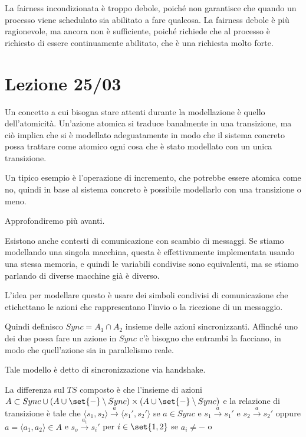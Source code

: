 La fairness incondizionata è troppo debole, poiché non garantisce che quando un processo viene schedulato sia abilitato a fare qualcosa. La fairness debole è più ragionevole, ma ancora non è sufficiente, poiché richiede che al processo è richiesto di essere continuamente abilitato, che è una richiesta molto forte.

\chapter{Lezione 25/03}

Un concetto a cui bisogna stare attenti durante la modellazione è quello dell'atomicità. Un'azione atomica si traduce banalmente in una transizione, ma ciò implica che si è modellato adeguatamente in modo che il sistema concreto possa trattare come atomico ogni cosa che è stato modellato con un unica transizione.

Un tipico esempio è l'operazione di incremento, che potrebbe essere atomica come no, quindi in base al sistema concreto è possibile modellarlo con una transizione o meno.

Approfondiremo più avanti.

Esistono anche contesti di comunicazione con scambio di messaggi. Se stiamo modellando una singola macchina, questa è effettivamente implementata usando una stessa memoria, e quindi le variabili condivise sono equivalenti, ma se stiamo parlando di diverse macchine già è diverso.

L'idea per modellare questo è usare dei simboli condivisi di comunicazione che etichettano le azioni che rappresentano l'invio o la ricezione di un messaggio.

Quindi definisco \(Sync = A_1 \cap A_2\) insieme delle azioni sincronizzanti. Affinché uno dei due possa fare un azione in \(Sync\) c'è bisogno che entrambi la facciano, in modo che quell'azione sia in parallelismo reale.

Tale modello è detto di sincronizzazione via handshake.

La differenza sul \(TS\) composto è che l'insieme di azioni \(A \subset Sync \cup (A\cup\set{-}\setminus Sync)\times(A\cup\set{-}\setminus Sync)\) e la relazione di transizione è tale che \(\langle s_1,s_2\rangle \xrightarrow{a} \langle s_1',s_2'\rangle\) se \(a \in Sync\) e \(s_1 \xrightarrow{a} s_1'\) e \(s_2 \xrightarrow{a} s_2'\) oppure \(a = \langle a_1, a_2\rangle \in A\) e \(s_o\xrightarrow{a_1} s_i'\) per \(i \in \set{1,2}\) se \(a_i \neq -\) o %

